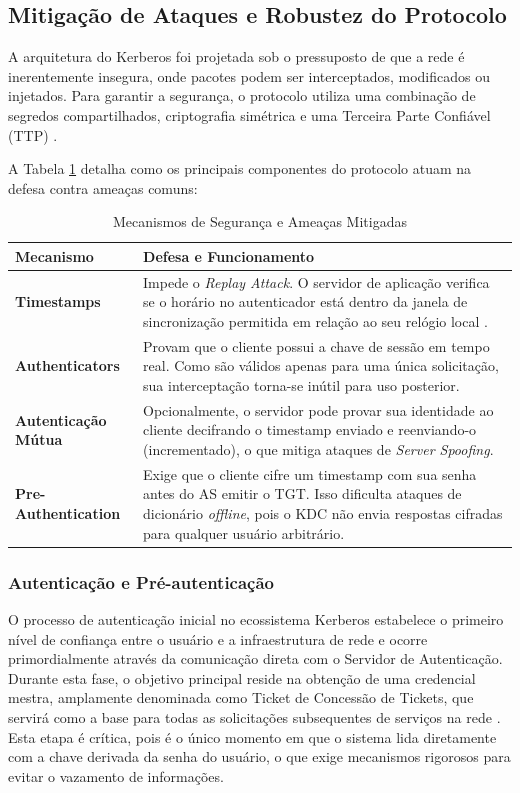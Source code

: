 \subsection{Mitigação de Ataques e Robustez do Protocolo}

A arquitetura do Kerberos foi projetada sob o pressuposto de que a rede é inerentemente insegura, onde pacotes podem ser interceptados, modificados ou injetados. Para garantir a segurança, o protocolo utiliza uma combinação de segredos compartilhados, criptografia simétrica e uma Terceira Parte Confiável (TTP) \cite{coulouris2013}.

A Tabela \ref{tab:mitigacao} detalha como os principais componentes do protocolo atuam na defesa contra ameaças comuns:

\begin{table}[h]
\centering
\caption{Mecanismos de Segurança e Ameaças Mitigadas}
\label{tab:mitigacao}
\begin{tabular}{|l|p{9.5cm}|}
\hline
\rowcolor[HTML]{EFEFEF} 
\textbf{Mecanismo} & \textbf{Defesa e Funcionamento} \\ \hline
\textbf{Timestamps} & Impede o \textit{Replay Attack}. O servidor de aplicação verifica se o horário no autenticador está dentro da janela de sincronização permitida em relação ao seu relógio local \cite{neuman1994}. \\ \hline
\textbf{Authenticators} & Provam que o cliente possui a chave de sessão em tempo real. Como são válidos apenas para uma única solicitação, sua interceptação torna-se inútil para uso posterior. \\ \hline
\textbf{Autenticação Mútua} & Opcionalmente, o servidor pode provar sua identidade ao cliente decifrando o timestamp enviado e reenviando-o (incrementado), o que mitiga ataques de \textit{Server Spoofing}. \\ \hline
\textbf{Pre-Authentication} & Exige que o cliente cifre um timestamp com sua senha antes do AS emitir o TGT. Isso dificulta ataques de dicionário \textit{offline}, pois o KDC não envia respostas cifradas para qualquer usuário arbitrário. \\ \hline
\end{tabular}
\end{table}

\subsubsection{Autenticação e Pré-autenticação}

O processo de autenticação inicial no ecossistema Kerberos estabelece o primeiro nível de confiança entre o usuário e a infraestrutura de rede e ocorre primordialmente através da comunicação direta com o Servidor de Autenticação. Durante esta fase, o objetivo principal reside na obtenção de uma credencial mestra, amplamente denominada como Ticket de Concessão de Tickets, que servirá como a base para todas as solicitações subsequentes de serviços na rede \cite{neuman1994}. Esta etapa é crítica, pois é o único momento em que o sistema lida diretamente com a chave derivada da senha do usuário, o que exige mecanismos rigorosos para evitar o vazamento de informações.

